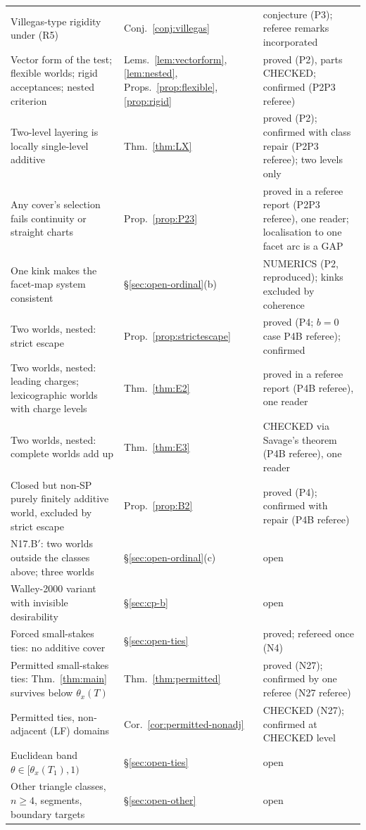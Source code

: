 \documentclass[11pt]{article}
\theoremstyle{definition}
\theoremstyle{remark}
\begin{document}
{\begin{longtable}{>{\raggedright\arraybackslash}p{6.4cm}>{\raggedright\arraybackslash}p{2.1cm}>{\raggedright\arraybackslash}p{5.6cm}}
Villegas-type rigidity under (R5) & Conj.~\ref{conj:villegas} & conjecture (P3); referee remarks incorporated\\
Vector form of the test; flexible worlds; rigid acceptances; nested criterion & Lems.~\ref{lem:vectorform}, \ref{lem:nested}, Props.~\ref{prop:flexible}, \ref{prop:rigid} & proved (P2), parts CHECKED; confirmed (P2P3 referee)\\
Two-level layering is locally single-level additive & Thm.~\ref{thm:LX} & proved (P2); confirmed with class repair (P2P3 referee); two levels only\\
Any cover's selection fails continuity or straight charts & Prop.~\ref{prop:P23} & proved in a referee report (P2P3 referee), one reader; localisation to one facet arc is a GAP\\
One kink makes the facet-map system consistent & \S\ref{sec:open-ordinal}(b) & NUMERICS (P2, reproduced); kinks excluded by coherence\\
Two worlds, nested: strict escape & Prop.~\ref{prop:strictescape} & proved (P4; $b=0$ case P4B referee); confirmed\\
Two worlds, nested: leading charges; lexicographic worlds with charge levels & Thm.~\ref{thm:E2} & proved in a referee report (P4B referee), one reader\\
Two worlds, nested: complete worlds add up & Thm.~\ref{thm:E3} & CHECKED via Savage's theorem (P4B referee), one reader\\
Closed but non-SP purely finitely additive world, excluded by strict escape & Prop.~\ref{prop:B2} & proved (P4); confirmed with repair (P4B referee)\\
N17.B$'$: two worlds outside the classes above; three worlds & \S\ref{sec:open-ordinal}(c) & open\\
Walley-2000 variant with invisible desirability & \S\ref{sec:cp-b} & open\\
Forced small-stakes ties: no additive cover & \S\ref{sec:open-ties} & proved; refereed once (N4)\\
Permitted small-stakes ties: Thm.~\ref{thm:main} survives below $\theta_x(T)$ & Thm.~\ref{thm:permitted} & proved (N27); confirmed by one referee (N27 referee)\\
Permitted ties, non-adjacent (LF) domains & Cor.~\ref{cor:permitted-nonadj} & CHECKED (N27); confirmed at CHECKED level\\
Euclidean band $\theta\in[\theta_x(T_1),1)$ & \S\ref{sec:open-ties} & open\\
Other triangle classes, $n\ge4$, segments, boundary targets & \S\ref{sec:open-other} & open\\
\bottomrule
\end{longtable}}
\end{document}
